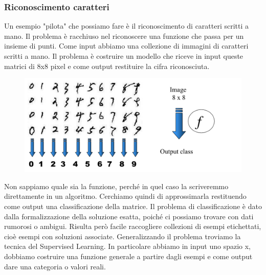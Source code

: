 \documentclass{article}
\begin{document}
\subsubsection{Riconoscimento caratteri}
Un esempio "pilota" che possiamo fare è il riconoscimento di caratteri scritti a mano. Il problema è racchiuso nel riconoscere una funzione che passa per un insieme di punti. Come input abbiamo una collezione di immagini di caratteri scritti a mano. Il problema è costruire un modello che riceve in input queste matrici di 8x8 pixel e come output restituire la cifra riconosciuta. \newline
\begin{figure}[H]
    \centering
    \includegraphics[scale=0.5]{Images/caratteririconoscimento.png}
\end{figure}
Non sappiamo quale sia la funzione, perché in quel caso la scriveremmo direttamente in un algoritmo. Cerchiamo quindi di approssimarla restituendo come output una classificazione della matrice. Il problema di classificazione è dato dalla formalizzazione della soluzione esatta, poiché ci possiamo trovare con dati rumorosi o ambigui. Risulta però facile raccogliere collezioni di esempi etichettati, cioè esempi con soluzioni associate. \newline
Generalizzando il problema troviamo la tecnica del Supervised Learning. In particolare abbiamo in input uno spazio x, dobbiamo costruire una funzione generale a partire dagli esempi e come output dare una categoria o valori reali. 
\end{document}
